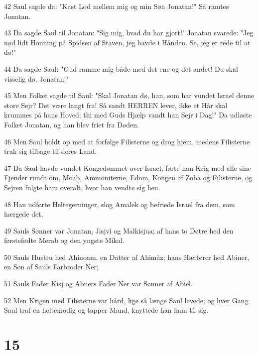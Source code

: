 \par 42 Saul sagde da: "Kast Lod mellem mig og min Søn Jonatan!" Så ramtes Jonatan.
\par 43 Da sagde Saul til Jonatan: "Sig mig, hvad du har gjort!" Jonatan svarede: "Jeg nød lidt Honning på Spidsen af Staven, jeg havde i Hånden. Se, jeg er rede til at dø!"
\par 44 Da sagde Saul: "Gud ramme mig både med det ene og det andet! Du skal visselig dø, Jonatan!"
\par 45 Men Folket sagde til Saul: "Skal Jonatan dø, han, som har vundet Israel denne store Sejr? Det være langt fra! Så sandt HERREN lever, ikke et Hår skal krummes på hans Hoved; thi med Guds Hjælp vandt han Sejr i Dag!" Da udløste Folket Jonatan, og han blev friet fra Døden.
\par 46 Men Saul holdt op med at forfølge Filisterne og drog hjem, medens Filisterne trak sig tilbage til deres Land.
\par 47 Da Saul havde vundet Kongedømmet over Israel, førte han Krig med alle sine Fjender rundt om, Moab, Ammoniterne, Edom, Kongen af Zoba og Filisterne, og Sejren fulgte ham overalt, hvor han vendte sig hen.
\par 48 Han udførte Heltegerninger, slog Amalek og befriede Israel fra dem, som hærgede det.
\par 49 Sauls Sønner var Jonatan, Jisjvi og Malkisjua; af hans to Døtre hed den førstefødte Merab og den yngste Mikal.
\par 50 Sauls Hustru hed Ahinoam, en Datter af Ahimåz; hans Hærfører hed Abiner, en Søn af Sauls Farbroder Ner;
\par 51 Sauls Fader Kisj og Abners Fader Ner var Sønner af Abiel.
\par 52 Men Krigen med Filisterne var hård, lige så længe Saul levede; og hver Gang Saul traf en heltemodig og tapper Mand, knyttede han ham til sig.

\chapter{15}

